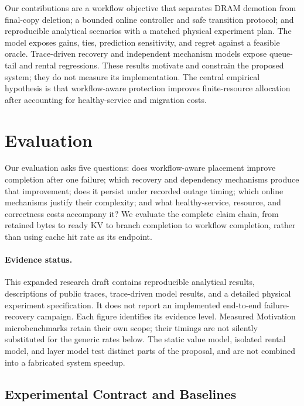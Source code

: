 \documentclass[sigplan,10pt,anonymous,nonacm]{acmart}
\begin{document}
Our contributions are a workflow objective that separates DRAM demotion
from final-copy deletion; a bounded online controller and safe transition
protocol; and reproducible analytical scenarios with a matched physical
experiment plan. The model exposes gains, ties, prediction sensitivity,
and regret against a feasible oracle. Trace-driven recovery and independent
mechanism models expose queue-tail and rental regressions. These results
motivate and constrain the proposed
system; they do not measure its implementation. The central empirical
hypothesis is that workflow-aware protection improves finite-resource
allocation after accounting for healthy-service and migration costs.




\section{Evaluation}
\label{sec:evaluation}

Our evaluation asks five questions: does workflow-aware placement improve
completion after one failure; which recovery and dependency mechanisms
produce that improvement; does it persist under recorded outage timing;
which online mechanisms justify their complexity; and what healthy-service,
resource, and correctness costs accompany it? We evaluate the complete
claim chain, from retained bytes to ready KV to branch completion to
workflow completion, rather than using cache hit rate as its endpoint.

\paragraph{Evidence status.}
This expanded research draft contains reproducible analytical results,
descriptions of public traces, trace-driven model results, and a detailed
physical experiment specification. It does not report an implemented
end-to-end failure-recovery campaign. Each figure identifies its evidence
level. Measured Motivation microbenchmarks retain their own scope;
their timings are not silently substituted for the generic rates below.
The static value model, isolated rental model, and layer model test distinct
parts of the proposal, and are not combined into a fabricated system speedup.

\FloatBarrier
\subsection{Experimental Contract and Baselines}
\label{sec:eval-method}
\end{document}
